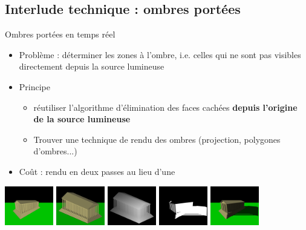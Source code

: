 \subsection{Interlude technique : ombres portées}

\begin{frame}[t]{Ombres portées en temps réel}
  \begin{itemize}

    \item Problème : déterminer les zones à l'ombre, i.e. celles qui ne sont pas visibles directement depuis la source lumineuse

    \item Principe
      \begin{itemize}
        \item réutiliser l'algorithme d'élimination des faces cachées \textbf{depuis l'origine de la source lumineuse}
        \item Trouver une technique de rendu des ombres (projection, polygones d'ombres...)
      \end{itemize}
    \item Coût : rendu en deux passes au lieu d'une
  \end{itemize}
  \begin{center}
    \includegraphics[height=1.7cm]{figs/3noshadow.png} \hspace{0.1cm}
    \includegraphics[height=1.7cm]{figs/1light.png} \hspace{0.1cm}
    \includegraphics[height=1.7cm]{figs/2shadowmap.png} \hspace{0.1cm}
    \includegraphics[height=1.7cm]{figs/5failed.png} \hspace{0.1cm}
    \includegraphics[height=1.7cm]{figs/7fin.png} \hspace{0.1cm}
  \end{center}
\end{frame}
